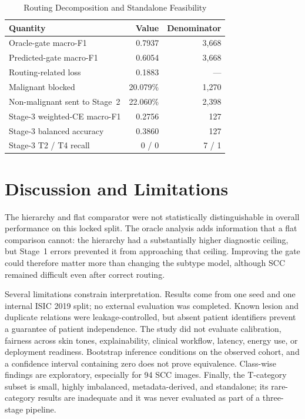 \documentclass[a4paper,conference]{IEEEtran}
\begin{document}
\begin{table}[t]
\caption{Routing Decomposition and Standalone Feasibility}
\label{tab:routing}
\centering
\setlength{\tabcolsep}{3.2pt}
\begin{tabular}{lrr}
\toprule
Quantity & Value & Denominator\\
\midrule
Oracle-gate macro-F1 & 0.7937 & 3,668\\
Predicted-gate macro-F1 & 0.6054 & 3,668\\
Routing-related loss & 0.1883 & ---\\
Malignant blocked & 20.079\% & 1,270\\
Non-malignant sent to Stage~2 & 22.060\% & 2,398\\
\midrule
Stage-3 weighted-CE macro-F1 & 0.2756 & 127\\
Stage-3 balanced accuracy & 0.3860 & 127\\
Stage-3 T2 / T4 recall & 0 / 0 & 7 / 1\\
\bottomrule
\end{tabular}
\end{table}

\section{Discussion and Limitations}
The hierarchy and flat comparator were not statistically distinguishable in
overall performance on this locked split. The oracle analysis adds information
that a flat comparison cannot: the hierarchy had a substantially higher
diagnostic ceiling, but Stage~1 errors prevented it from approaching that
ceiling. Improving the gate could therefore matter more than changing the
subtype model, although SCC remained difficult even after correct routing.

Several limitations constrain interpretation. Results come from one seed and
one internal ISIC 2019 split; no external evaluation was completed. Known
lesion and duplicate relations were leakage-controlled, but absent patient
identifiers prevent a guarantee of patient independence. The study did not
evaluate calibration, fairness across skin tones, explainability, clinical
workflow, latency, energy use, or deployment readiness. Bootstrap inference
conditions on the observed cohort, and a confidence interval containing zero
does not prove equivalence. Class-wise findings are exploratory, especially
for 94 SCC images. Finally, the T-category subset is small, highly imbalanced,
metadata-derived, and standalone; its rare-category results are inadequate and
it was never evaluated as part of a three-stage pipeline.
\end{document}
